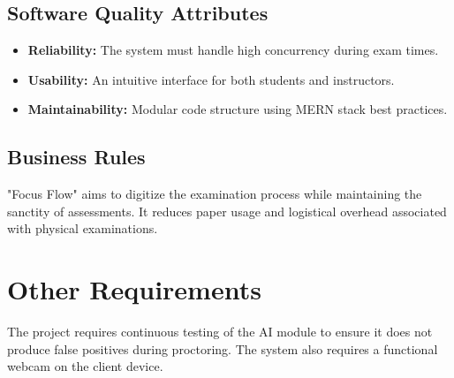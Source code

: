 \documentclass{scrreprt}
\begin{document}
\section{Software Quality Attributes}
\begin{itemize}
    \item \textbf{Reliability:} The system must handle high concurrency during exam times.
    \item \textbf{Usability:} An intuitive interface for both students and instructors.
    \item \textbf{Maintainability:} Modular code structure using MERN stack best practices.
\end{itemize}

\section{Business Rules}
"Focus Flow" aims to digitize the examination process while maintaining the sanctity of assessments. It reduces paper usage and logistical overhead associated with physical examinations.

\chapter{Other Requirements}
The project requires continuous testing of the AI module to ensure it does not produce false positives during proctoring. The system also requires a functional webcam on the client device.
\end{document}

